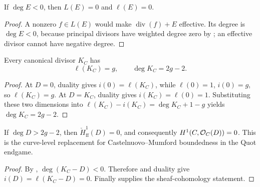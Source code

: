 \begin{lemma}
  \label{thm:adelic_negative_degree_vanishing}
  If \(\deg E<0\), then \(L(E)=0\) and \(\ell(E)=0\).
\end{lemma}
\begin{proof}
  A nonzero \(f\in L(E)\) would make
  \(\operatorname{div}(f)+E\) effective.  Its degree is \(\deg E<0\),
  because principal divisors have weighted degree zero by
  ; an effective divisor cannot
  have negative degree.
\end{proof}

\begin{theorem}
  \label{thm:adelic_canonical_degree}
  \notready
  Every canonical divisor \(K_C\) has
  \[
    \ell(K_C)=g,
    \qquad \deg K_C=2g-2.
  \]
\end{theorem}
\begin{proof}
  At \(D=0\), duality gives \(i(0)=\ell(K_C)\), while
  \(\ell(0)=1\), \(i(0)=g\), so \(\ell(K_C)=g\).  At \(D=K_C\),
  duality gives \(i(K_C)=\ell(0)=1\).  Substituting these two dimensions
  into \(\ell(K_C)-i(K_C)=\deg K_C+1-g\) yields
  \(\deg K_C=2g-2\).
\end{proof}

\begin{corollary}
[Vanishing: \(i(D) = 0\) for \(\deg D > 2g - 2\)]
  \label{thm:adelic_h1_vanishing}
  \notready
  If \(\deg D>2g-2\), then
  \(\check H^1_{\mathrm{ff}}(D)=0\), and consequently
  \(H^1(C,\mathcal{O}_{C}(D))=0\).  This is the curve-level replacement for
  Castelnuovo--Mumford boundedness in the Quot endgame.
\end{corollary}
\begin{proof}
  By , \(\deg(K_C-D)<0\).  Therefore
   and duality give
  \(i(D)=\ell(K_C-D)=0\).  Finally
   supplies the sheaf-cohomology
  statement.
\end{proof}

